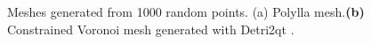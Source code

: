\documentclass[lineno,pdflatex,sn-mathphys]{sn-jnl}%
\theoremstyle{thmstyleone}%
\theoremstyle{thmstyletwo}%
\theoremstyle{thmstylethree}%
\begin{document}

\begin{figure}[]
\centering     %
{} 
\caption{Meshes generated from 1000 random points. (a) Polylla mesh.\textbf{(b)} Constrained Voronoi mesh generated with Detri2qt \cite{Detri2}. }
\label{figs:voro_comp} 
\end{figure}
\end{document}
